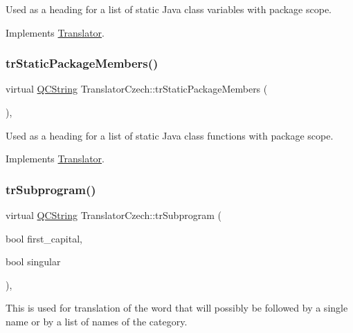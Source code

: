 Used as a heading for a list of static Java class variables with package scope. 

Implements \mbox{\hyperlink{class_translator}{Translator}}.

\mbox{\label{class_translator_czech_a91fbd284b264185d83624aa3eb48412a}} 
\subsubsection{\texorpdfstring{trStaticPackageMembers()}{trStaticPackageMembers()}}
{\footnotesize\ttfamily virtual \mbox{\hyperlink{class_q_c_string}{Q\+C\+String}} Translator\+Czech\+::tr\+Static\+Package\+Members (\begin{DoxyParamCaption}{ }\end{DoxyParamCaption})\hspace{0.3cm}{\ttfamily [inline]}, {\ttfamily [virtual]}}

Used as a heading for a list of static Java class functions with package scope. 

Implements \mbox{\hyperlink{class_translator}{Translator}}.

\mbox{\label{class_translator_czech_ad3fa0120c49499f1c4fb059508d3dc65}} 
\subsubsection{\texorpdfstring{trSubprogram()}{trSubprogram()}}
{\footnotesize\ttfamily virtual \mbox{\hyperlink{class_q_c_string}{Q\+C\+String}} Translator\+Czech\+::tr\+Subprogram (\begin{DoxyParamCaption}\item[{bool}]{first\+\_\+capital,  }\item[{bool}]{singular }\end{DoxyParamCaption})\hspace{0.3cm}{\ttfamily [inline]}, {\ttfamily [virtual]}}

This is used for translation of the word that will possibly be followed by a single name or by a list of names of the category. 

